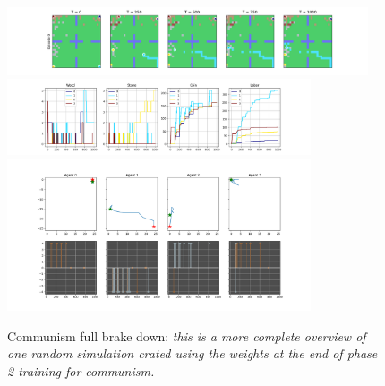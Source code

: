 \begin{figure}[h!]
    \centering
    \linespread{.9}
    \includegraphics[width=0.95\textwidth]{Resources/imgs/Figure_1_Comm.png}
    \includegraphics[width=0.80\textwidth]{Resources/imgs/Figure_2_Comm.png}
    \includegraphics[width=0.80\textwidth]{Resources/imgs/Figure_3_Comm.png}
    \caption[Communism full brake down: ]%
    {\label{img:p0_brakedown}Communism full brake down: \small \textit{this is a more complete overview of one random simulation crated using the weights at the end of phase 2 training for communism.}}
\end{figure}

